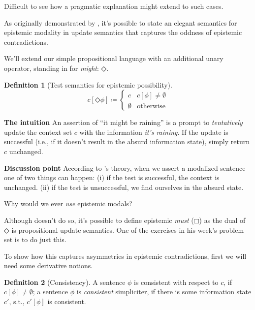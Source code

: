 \documentclass[nols,twoside,nofonts,nobib,nohyper]{tufte-handout}
\theoremstyle{definition}
\newtheorem{definition}{Definition}[section]
\begin{document}
Difficult to see how a pragmatic explanation might extend to such cases.

As originally demonstrated by \citet{Veltman1996}, it's possible to state an elegant semantics for epistemic modality in update semantics that captures the oddness of epistemic contradictions.

We'll extend our simple propositional language with an additional unary operator, standing in for \textit{might}: $◇$.

\begin{definition}[Test semantics for epistemic possibility]
  $$
  c[◇ \phi] ≔ \begin{cases}
    c&c[\phi] ≠ ∅\\
    ∅&\text{otherwise}
    \end{cases}
  $$
\end{definition}

\begin{tcolorbox}
  \textbf{The intuition}
  \tcblower
  An assertion of \enquote{it might be raining} is a prompt to \textit{tentatively} update the context set $c$ with the information \textit{it's raining}. If the update is successful (i.e., if it doesn't result in the absurd information state), simply return $c$ unchanged.
\end{tcolorbox}

\begin{tcolorbox}
  \textbf{Discussion point}
  \tcblower
  According to \citeauthor{Veltman1996}'s theory, when we assert a modalized sentence one of two things can happen: (i) if the test is successful, the context is unchanged. (ii) if the test is unsuccessful, we find ourselves in the absurd state.

  Why would we ever \textit{use} epistemic modals?
\end{tcolorbox}

Although \citeauthor{Veltman1996} doesn't do so, it's possible to define epistemic \textit{must} ($□$) as the dual of $◇$ is propositional update semantics. One of the exercises in his week's problem set is to do just this.

To show how this captures asymmetries in epistemic contradictions, first we will need some derivative notions.

\begin{definition}[Consistency]
A sentence $ϕ$ is consistent with respect to $c$, if $c[ϕ] ≠ ∅$; a sentence $ϕ$ is \textit{consistent} simpliciter, if there is some information state $c'$, s.t., $c'[ϕ]$ is consistent.
\end{definition}
\end{document}
